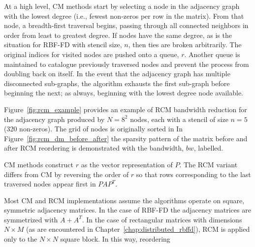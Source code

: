 \documentclass{report}
\begin{document}
At a high level, CM methods start by selecting a node in the adjacency graph with the lowest degree (i.e., fewest non-zeros per row in the matrix). From that node, a breadth-first traversal begins, passing through all connected neighbors in order from least to greatest degree. If nodes have the same degree, as is the situation for RBF-FD with stencil size, $n$, then ties are broken arbitrarily. The original indices for visited nodes are pushed onto a queue, $r$. Another queue is maintained to catalogue previously traversed nodes and prevent the process from doubling back on itself. In the event that the adjacency graph has multiple disconnected sub-graphs, the algorithm exhausts the first sub-graph before beginning the next; as always, beginning with the lowest degree node available. 

Figure~\ref{fig:rcm_example} provides an example of RCM bandwidth reduction for the adjacency graph produced by $N=8^2$ nodes, each with a stencil of size $n=5$ (320 non-zeros). The grid of nodes is originally sorted in  In Figure~\ref{fig:rcm_dm_before_after} the sparsity pattern of the matrix before and after RCM reordering is demonstrated with the bandwidth, $bw$, labelled. 

CM methods construct $r$ as the vector representation of $P$. The RCM variant differs from CM by reversing the order of $r$ so that rows corresponding to the last traversed nodes appear first in $PAP^T$. 

Most CM and RCM implementations assume the algorithms operate on square, symmetric adjacency matrices. In the case of RBF-FD the adjacency matrices are symmetrized with $A+A^T$. In the case of rectangular matrices with dimensions $N \times M$ (as are encountered in Chapter~\ref{chap:distributed_rbffd}), RCM is applied only to the $N\times N$ square block. In this way, reordering 
\end{document}
